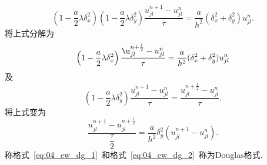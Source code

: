 \begin{equation}
\left(1-\dfrac{a}{2}\lambda\delta_x^2\right)\left(1-\dfrac{a}{2}\lambda\delta_y^2\right)
\dfrac{u_{jl}^{n+1}-u_{jl}^{n}}{\tau}=\dfrac{a}{h^2}(\delta_x^2+\delta_y^2)u_{jl}^n.
\end{equation}
将上式分解为
\begin{equation}\label{eq:04_ew_dg_1}
\left(1-\dfrac{a}{2}\lambda\delta_x^2\right)\dfrac{\u_{jl}^{n+\frac{1}{2}}-u_{jl}^n}{\tau}
=\dfrac{a}{h^2}(\delta_x^2+\delta_y^2)u_{jl}^n
\end{equation}
及
\begin{equation}
\left(1-\dfrac{a}{2}\lambda\delta_y^2\right)\dfrac{u_{jl}^{n+1}-u_{jl}^{n}}{\tau}=
\dfrac{u_{jl}^{n+\frac{1}{2}}-u_{jl}^n}{\tau}.
\end{equation}
将上式变为
\begin{equation}\label{eq:04_ew_dg_2}
\dfrac{u_{jl}^{n+1}-u_{jl}^{n+\frac{1}{2}}}{\dfrac{\tau}{2}}=\dfrac{a}{h^2}\delta_y^2(u_{jl}^{n+1}
-u_{jl}^n).
\end{equation}
称格式~\ref{eq:04_ew_dg_1}~和格式~\ref{eq:04_ew_dg_2}~称为Douglas格式.
